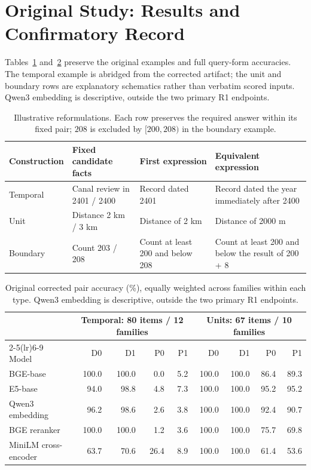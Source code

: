 \documentclass[conference,letterpaper]{IEEEtran}
\begin{document}
\section{Original Study: Results and Confirmatory Record}\label{app:original}
Tables~\ref{tab:examples} and~\ref{tab:original} preserve the original examples and full query-form accuracies. The temporal example is abridged from the corrected artifact; the unit and boundary rows are explanatory schematics rather than verbatim scored inputs. Qwen3 embedding is descriptive, outside the two primary R1 endpoints.
\begin{table}[t]
\caption{Illustrative reformulations. Each row preserves the required answer within its fixed pair; $208$ is excluded by $[200,208)$ in the boundary example.}
\label{tab:examples}
\centering\small
\begin{tabular}{p{}p{}p{}p{}}
\toprule
Construction & Fixed candidate facts & First expression & Equivalent expression \\
\midrule
Temporal & Canal review in 2401 / 2400 & Record dated 2401 & Record dated the year immediately after 2400 \\
Unit & Distance 2 km / 3 km & Distance of 2 km & Distance of 2000 m \\
Boundary & Count 203 / 208 & Count at least 200 and below 208 & Count at least 200 and below the result of 200 + 8 \\
\bottomrule
\end{tabular}
\end{table}
\begin{table}[t]
\caption{Original corrected pair accuracy (\%), equally weighted across families within each type. Qwen3 embedding is descriptive, outside the two primary R1 endpoints.}
\label{tab:original}
\centering\small
\begin{tabular}{lrrrrrrrr}
\toprule
& \multicolumn{4}{c}{Temporal: 80 items / 12 families} & \multicolumn{4}{c}{Units: 67 items / 10 families} \\
\cmidrule(lr){2-5}\cmidrule(lr){6-9}
Model & D0 & D1 & P0 & P1 & D0 & D1 & P0 & P1 \\
\midrule
BGE-base & 100.0 & 100.0 & 0.0 & 5.2 & 100.0 & 100.0 & 86.4 & 89.3 \\
E5-base & 94.0 & 98.8 & 4.8 & 7.3 & 100.0 & 100.0 & 95.2 & 95.2 \\
Qwen3 embedding & 96.2 & 98.6 & 2.6 & 3.8 & 100.0 & 100.0 & 92.4 & 90.7 \\
BGE reranker & 100.0 & 100.0 & 1.2 & 3.6 & 100.0 & 100.0 & 75.7 & 69.8 \\
MiniLM cross-encoder & 63.7 & 70.6 & 26.4 & 8.9 & 100.0 & 100.0 & 61.4 & 53.6 \\
\bottomrule
\end{tabular}
\end{table}
\end{document}
